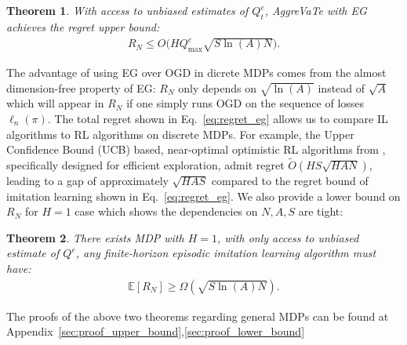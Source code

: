 \documentclass{article}
\newtheorem{theorem}{Theorem}[section]
\begin{document}
\begin{theorem}
\label{them:upper_bound}
With access to unbiased estimates of $Q^e_t$, AggreVaTe with EG achieves the regret upper bound:
\begin{align}
\label{eq:regret_eg}
R_N \leq O\big(HQ_{\max}^e\sqrt{S\ln(A)N}\big).
\end{align}
\end{theorem}
The advantage of using EG over OGD in dicrete MDPs comes from the almost dimension-free property of EG: $R_N$ only depends on $\sqrt{\ln(A)}$ instead of $\sqrt{A}$ which will appear in $R_N$ if one simply runs OGD on the sequence of losses $\ell_n(\pi)$. The total regret shown in Eq.~\ref{eq:regret_eg} allows us to compare IL algorithms to RL algorithms on discrete MDPs. For example, the Upper Confidence Bound (UCB) based, near-optimal optimistic RL algorithms from \cite{jaksch2010near}, specifically designed for efficient exploration, admit regret $\tilde{O}(HS\sqrt{H AN})$, leading to a gap of approximately $\sqrt{HAS}$ compared to the regret bound of imitation learning shown in Eq.~\ref{eq:regret_eg}. We also provide a lower bound on $R_N$ for $H=1$ case which shows the dependencies on $N, A, S$ are tight:
\begin{theorem}
\label{them:lower_bound}
There exists MDP with $H = 1$, with only access to unbiased estimate of $Q^e$, any finite-horizon episodic imitation learning algorithm  must have:
\begin{align}
\mathbb{E}[R_N] \geq \Omega(\sqrt{S\ln({A})N}).
\end{align}
\end{theorem} The proofs of the above two theorems regarding general MDPs can be found at Appendix~\ref{sec:proof_upper_bound},\ref{sec:proof_lower_bound}
\end{document}
